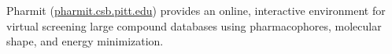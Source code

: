 Pharmit (\url{pharmit.csb.pitt.edu}) provides an online, interactive environment for virtual screening large compound databases using pharmacophores, molecular shape, and energy minimization.
